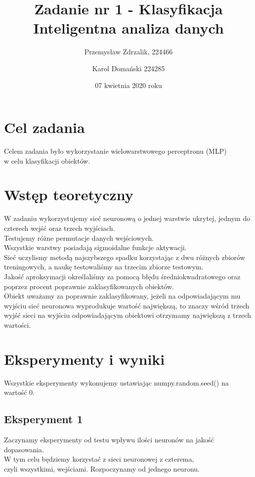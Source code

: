 \documentclass[12pt]{article}
\title{{\bf Zadanie nr 1 - Klasyfikacja}\linebreak
Inteligentna analiza danych}
\author{Przemysław Zdrzalik, 224466 \and Karol Domański 224285}
\date{07 kwietnia 2020 roku}
\begin{document}
\clearpage\maketitle
\thispagestyle{empty}
\newpage
\setcounter{page}{1}
\section{Cel zadania}

Celem zadania było wykorzystanie wielowarstwowego perceptronu (MLP) \\w celu klasyfikacji obiektów.

\section{Wstęp teoretyczny}

W zadaniu wykorzystujemy sieć neuronową o jednej warstwie ukrytej, jednym do czterech wejść oraz trzech wyjściach. \\Testujemy różne permutacje danych wejściowych. \\ Wszystkie warstwy posiadają sigmoidalne funkcje aktywacji. \\Sieć uczylismy metodą najszybszego spadku  korzystając z dwu różnych zbiorów treningowych, a naukę testowaliśmy na trzecim zbiorze testowym.\\
Jakość aproksymacji określaliśmy za pomocą błędu średniokwadratowego oraz poprzez procent poprawnie zaklasyfikowanych obiektów.\\ Obiekt uważamy za poprawnie zaklasyfikowany, jeżeli na odpowiadającym mu wyjściu sieć neuronowa wyprodukuje wartość największą, to znaczy wśród trzech wyjść sieci na wyjściu odpowiadającym obiektowi otrzymamy największą z trzech wartości.

\newpage
\section{Eksperymenty i wyniki} 

Wszystkie eksperymenty wykonujemy ustawiając numpy.random.seed() na wartość 0.

\subsection {Eksperyment 1}

Zaczynamy eksperymenty od testu wpływu ilości neuronów na jakość dopasowania.\\ W tym celu będziemy korzystać z sieci neuronowej z czterema,\\ czyli wszystkimi, wejściami. Rozpoczynamy od jednego neuronu.\\
\end{document}
